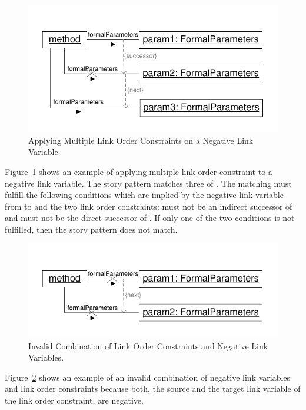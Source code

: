 {\begin{figure}[htbp]
\center
\includegraphics[width=0.75\columnwidth]{figures/LinkOrderConstraintDirectSuccessorNegative2}
\caption{Applying Multiple Link Order Constraints on a Negative Link Variable}
\label{fig:linkOrderConstraintDirectSuccessorNegative2}
\end{figure}

Figure~\ref{fig:linkOrderConstraintDirectSuccessorNegative2} shows an example of applying multiple link order constraint to a negative link variable. The story pattern matches three  of . The matching must fulfill the following conditions which are implied by the negative link variable from  to  and the two link order constraints:  must not be an indirect successor of  and  must not be the direct successor of . If only one of the two conditions is not fulfilled, then the story pattern does not match.

\begin{figure}[htbp]
\center
\includegraphics[width=0.75\columnwidth]{figures/LinkOrderConstraintDirectSuccessorNegative3}
\caption{Invalid Combination of Link Order Constraints and Negative Link Variables.}
\label{fig:linkOrderConstraintDirectSuccessorNegative3}
\end{figure}

Figure~\ref{fig:linkOrderConstraintDirectSuccessorNegative3} shows an example of an invalid combination of negative link variables and link order constraints because both, the source and the target link variable of the link order constraint, are negative. 

}
